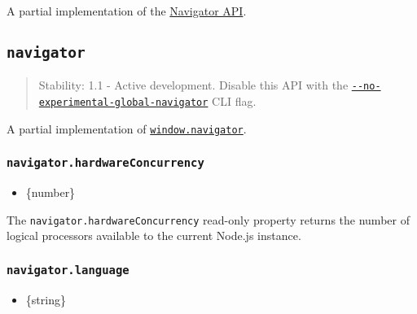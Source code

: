 A partial implementation of the
\href{https://html.spec.whatwg.org/multipage/system-state.html\#the-navigator-object}{Navigator
API}.

\subsection{\texorpdfstring{\texttt{navigator}}{navigator}}\label{navigator-1}

\begin{quote}
Stability: 1.1 - Active development. Disable this API with the
\href{cli.md\#--no-experimental-global-navigator}{\texttt{-\/-no-experimental-global-navigator}}
CLI flag.
\end{quote}

A partial implementation of
\href{https://developer.mozilla.org/en-US/docs/Web/API/Window/navigator}{\texttt{window.navigator}}.

\subsubsection{\texorpdfstring{\texttt{navigator.hardwareConcurrency}}{navigator.hardwareConcurrency}}\label{navigator.hardwareconcurrency}

\begin{itemize}
\tightlist
\item
  \{number\}
\end{itemize}

The \texttt{navigator.hardwareConcurrency} read-only property returns
the number of logical processors available to the current Node.js
instance.

\begin{Shaded}
\begin{Highlighting}[]
\NormalTok{(}\SpecialCharTok{$\{}\SpecialCharTok{\}}\NormalTok{)}\OperatorTok{;}
\end{Highlighting}
\end{Shaded}

\subsubsection{\texorpdfstring{\texttt{navigator.language}}{navigator.language}}\label{navigator.language}

\begin{itemize}
\tightlist
\item
  \{string\}
\end{itemize}

